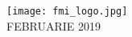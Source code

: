\begin{titlepage}
	
	
	\texttt{[image: fmi\_logo.jpg]}\\[1cm] %
	
	\vfill %
	{\large FEBRUARIE 2019}\\[3cm] %
	
	
\end{titlepage}